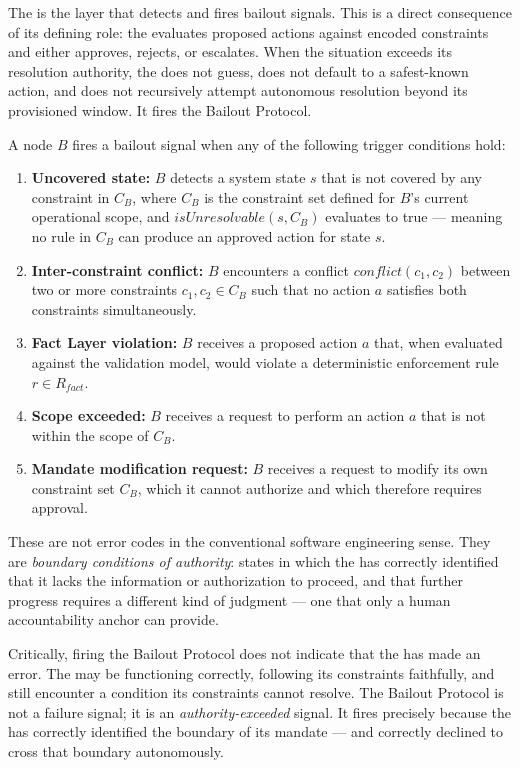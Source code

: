 The \bounds{} is the layer that detects and fires bailout signals. This is a direct consequence of its defining role: the \bounds{} evaluates proposed actions against encoded constraints and either approves, rejects, or escalates. When the situation exceeds its resolution authority, the \bounds{} does not guess, does not default to a safest-known action, and does not recursively attempt autonomous resolution beyond its provisioned window. It fires the Bailout Protocol.

A \bounds{} node $B$ fires a bailout signal when any of the following trigger conditions hold:

\begin{enumerate}
\item \textbf{Uncovered state:} $B$ detects a system state $s$ that is not covered by any constraint in $C_B$, where $C_B$ is the constraint set defined for $B$'s current operational scope, and $isUnresolvable(s, C_B)$ evaluates to true — meaning no rule in $C_B$ can produce an approved action for state $s$.
\item \textbf{Inter-constraint conflict:} $B$ encounters a conflict $conflict(c_1, c_2)$ between two or more constraints $c_1, c_2 \in C_B$ such that no action $a$ satisfies both constraints simultaneously.
\item \textbf{Fact Layer violation:} $B$ receives a proposed action $a$ that, when evaluated against the \fact{} validation model, would violate a deterministic enforcement rule $r \in R_{fact}$.
\item \textbf{Scope exceeded:} $B$ receives a request to perform an action $a$ that is not within the scope of $C_B$.
\item \textbf{Mandate modification request:} $B$ receives a request to modify its own constraint set $C_B$, which it cannot authorize and which therefore requires \purpose{} approval.
\end{enumerate}

These are not error codes in the conventional software engineering sense. They are \textit{boundary conditions of authority}: states in which the \bounds{} has correctly identified that it lacks the information or authorization to proceed, and that further progress requires a different kind of judgment — one that only a human accountability anchor can provide.

Critically, firing the Bailout Protocol does not indicate that the \bounds{} has made an error. The \bounds{} may be functioning correctly, following its constraints faithfully, and still encounter a condition its constraints cannot resolve. The Bailout Protocol is not a failure signal; it is an \textit{authority-exceeded} signal. It fires precisely because the \bounds{} has correctly identified the boundary of its mandate — and correctly declined to cross that boundary autonomously.

